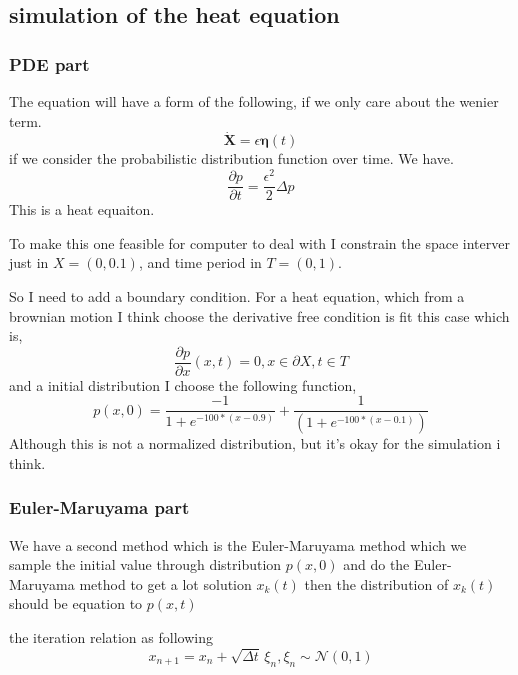 \documentclass{article}
\theoremstyle{definition} %
\begin{document}
\subsection{simulation of the heat equation}
\subsubsection{PDE part}
The equation will have a form of the following,
if we only care about the wenier term.
\[
    \dot{\mathbf{X}} =  \epsilon\boldsymbol{\eta}(t)
\]
if we consider the probabilistic distribution function
over time. We have.
\[
    \frac{\partial p}{\partial t} = \frac{\epsilon^2}{2}  \Delta p
\]
This is a heat equaiton.

To make this one feasible for computer to
deal with I constrain the space interver
just in \(X=(0,0.1)\), and time period in
\(T=(0,1)\).

So I need to add a boundary condition.
For a heat equation, which from a brownian
motion I think choose the derivative free condition
is fit this case which is,
\[
    \frac{\partial p}{\partial x}(x,t) = 0 , x\in\partial X, t\in T
\]
and a initial distribution I choose the following
function,
\[
    p(x,0)=\frac{-1}{1 + e^{-100 * (x - 0.9)}}+\frac{1}{(1 + e^{-100 * (x - 0.1)})}
\]
Although this is not a normalized distribution,
but it's okay for the simulation i think.


\subsubsection{Euler-Maruyama part}
We have a second method which is the
Euler-Maruyama method which we sample
the initial value through distribution
\(p(x,0)\) and do the Euler-Maruyama
method to get a lot solution
\(x_k(t)\) then the distribution of
\(x_k(t)\) should be equation to
\(p(x,t)\)

the iteration relation as following
\[
    x_{n+1}=x_n+\sqrt{\Delta t}\,\xi_n,\xi_n\sim \mathcal{N}(0, 1)
\]
\end{document}
